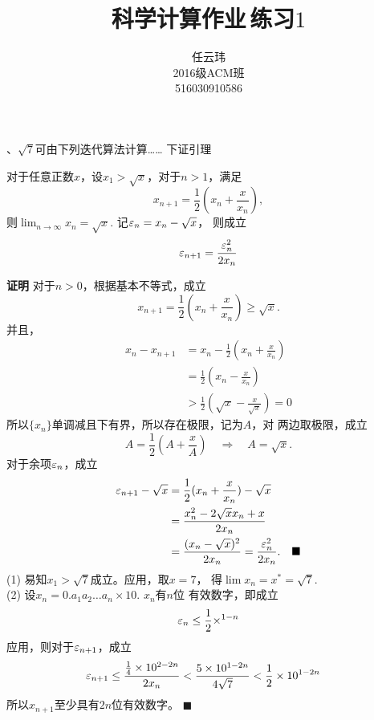 

\title{科学计算作业$\,$练习$1$}
\author{\small 任云玮\\\small2016级ACM班\\\small516030910586}
\date{}


\maketitle

、$\sqrt{7}$可由下列迭代算法计算……
\ans
  下证引理
  \begin{lemma}
    \label{lemma1}
    对于任意正数$x$，设$x_1>\sqrt{x}$，对于$n>1$，满足
    \begin{equation}
      \label{equ1}
      x_{n+1} = \frac12(x_n + \frac{x}{x_n}),
    \end{equation}
    则$\lim_{n\to\infty}x_n = \sqrt{x}$. 记$\varepsilon_n = x_n - \sqrt{x}$，
    则成立
    \[
      \varepsilon_{n+1} = \frac{\varepsilon_n^2}{2x_n}
    \]
  \end{lemma}
  \textbf{证明 }
    对于$n>0$，根据基本不等式，成立
    \[
      x_{n+1}=\frac{1}{2}(x_n+\frac{x}{x_n})\ge\sqrt{x}.
    \]
    并且，
    \[\begin{split}
      x_n-x_{n+1} &= x_n - \frac{1}{2}(x_n+\frac{x}{x_n}) \\
      &= \frac12(x_n - \frac{x}{x_n}) \\
      &> \frac12(\sqrt{x} - \frac{x}{\sqrt{x}}) = 0
    \end{split}\]
    所以$\{x_n\}$单调减且下有界，所以存在极限，记为$A$，对
    两边取极限，成立
    \[
      A = \frac{1}{2}(A+\frac{x}{A})\quad\Rightarrow\quad
      A = \sqrt{x}.
    \]
    对于余项$\varepsilon_n$，成立
    \[\begin{split}
      \varepsilon_{n+1} - \sqrt{x} &= \frac{1}{2}(x_n + \frac{x}{x_n}) - \sqrt{x} \\
      &= \frac{x_n^2 - 2\sqrt{x}x_n + x}{2x_n} \\
      &= \frac{(x_n - \sqrt{x})^2}{2x_n} = \frac{\varepsilon_n^2}{2x_n}.
      \quad\blacksquare
    \end{split}\]
  (1) 易知$x_1>\sqrt{7}$成立。应用，取$x=7$，
  得$\lim x_n = x^* = \sqrt{7}$.\\
  (2) 设$x_n = 0.a_1a_2\dots a_n\times10$. $x_n$有$n$位
  有效数字，即成立
  \[
    \varepsilon_n \le \frac12\times^{1-n}
  \]
  应用，则对于$\varepsilon_{n+1}$，成立
  \[\begin{split}
    \varepsilon_{n+1} &\le \frac{\frac{1}{4} \times 10^{2-2n}}{2x_n}
    < \frac{5\times10^{1-2n}}{4\sqrt{7}}
    < \frac{1}{2} \times 10^{1-2n}
  \end{split}\]
  所以$x_{n+1}$至少具有$2n$位有效数字。 $\blacksquare$

